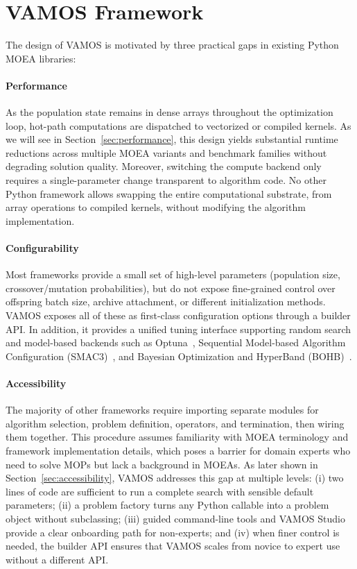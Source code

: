 \documentclass[final,5p,times,twocolumn]{elsarticle}
\begin{document}
\section{VAMOS Framework} \label{sec:framework}

The design of VAMOS is motivated by three practical gaps in existing Python MOEA libraries:

\paragraph{Performance} As the population state remains in dense arrays throughout the optimization loop, hot-path computations are dispatched to vectorized or compiled kernels. As we will see in Section~\ref{sec:performance}, this design yields substantial runtime reductions across multiple MOEA variants and benchmark families without degrading solution quality. Moreover, switching the compute backend only requires a single-parameter change transparent to algorithm code. No other Python framework allows swapping the entire computational substrate, from array operations to compiled kernels, without modifying the algorithm implementation.

\paragraph{Configurability} Most frameworks provide a small set of high-level parameters (population size, crossover/mutation probabilities), but do not expose fine-grained control over offspring batch size, archive attachment, or different initialization methods. VAMOS exposes all of these as first-class configuration options through a builder API. In addition, it provides a unified tuning interface supporting random search and model-based backends such as Optuna~\cite{ASY+19}, Sequential Model-based Algorithm Configuration (SMAC3)~\cite{LEF+22}, and Bayesian Optimization and HyperBand (BOHB)~\cite{FKH18}.

\paragraph{Accessibility} The majority of other frameworks require importing separate modules for algorithm selection, problem definition, operators, and termination, then wiring them together. This procedure assumes familiarity with MOEA terminology and framework implementation details, which poses a barrier for domain experts who need to solve MOPs but lack a background in MOEAs. As later shown in Section~\ref{sec:accessibility}, VAMOS addresses this gap at multiple levels: (i) two lines of code are sufficient to run a complete search with sensible default parameters; (ii) a problem factory turns any Python callable into a problem object without subclassing; (iii) guided command-line tools and VAMOS Studio provide a clear onboarding path for non-experts; and (iv) when finer control is needed, the builder API ensures that VAMOS scales from novice to expert use without a different API.
\end{document}

